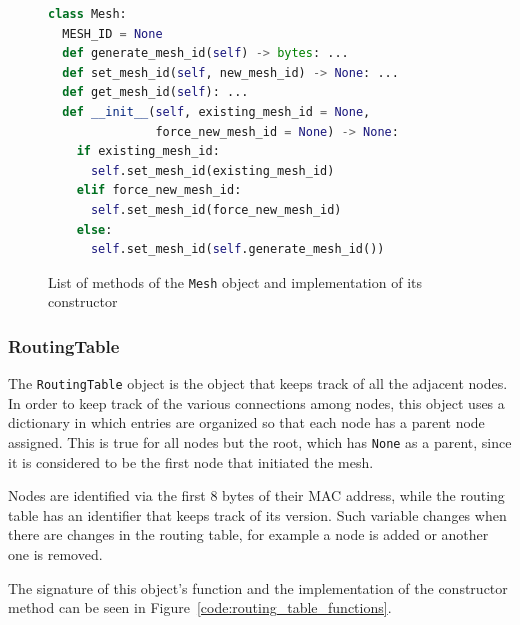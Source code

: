 				\begin{figure}[h]
					\begin{lstlisting}[language=python]
class Mesh:
  MESH_ID = None
  def generate_mesh_id(self) -> bytes: ...
  def set_mesh_id(self, new_mesh_id) -> None: ...
  def get_mesh_id(self): ...  
  def __init__(self, existing_mesh_id = None, 
               force_new_mesh_id = None) -> None:
    if existing_mesh_id:
      self.set_mesh_id(existing_mesh_id)
    elif force_new_mesh_id:
      self.set_mesh_id(force_new_mesh_id)
    else:
      self.set_mesh_id(self.generate_mesh_id())
					\end{lstlisting}
					\caption{List of methods of the \texttt{Mesh} object and implementation of its constructor}
					\label{code:mesh_function_list}
				\end{figure}
			
			\subsubsection{RoutingTable}
			
				The \texttt{RoutingTable} object is the object that keeps track of all the adjacent nodes.
				In order to keep track of the various connections among nodes, this object uses a dictionary in which entries are organized so that each node has a parent node assigned.
				This is true for all nodes but the root, which has \texttt{None} as a parent, since it is considered to be the first node that initiated the mesh.

				Nodes are identified via the first 8 bytes of their MAC address, while the routing table has an identifier that keeps track of its version.
				Such variable changes when there are changes in the routing table, for example a node is added or another one is removed.
				
				The signature of this object's function and the implementation of the constructor method can be seen in Figure~\ref{code:routing_table_functions}.
				
